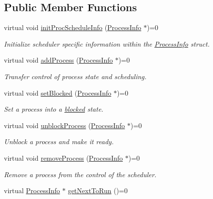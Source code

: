 \subsection*{\-Public \-Member \-Functions}
\begin{DoxyCompactItemize}
\item 
virtual void \hyperlink{classcScheduler_a8782803287dce0352623142643eee01a}{init\-Proc\-Schedule\-Info} (\hyperlink{structProcessInfo}{\-Process\-Info} $\ast$)=0
\begin{DoxyCompactList}\small\item\em \-Initialize scheduler specific information within the \hyperlink{structProcessInfo}{\-Process\-Info} struct. \end{DoxyCompactList}\item 
virtual void \hyperlink{classcScheduler_aeae779c5c160a441e725dfc72656e6dc}{add\-Process} (\hyperlink{structProcessInfo}{\-Process\-Info} $\ast$)=0
\begin{DoxyCompactList}\small\item\em \-Transfer control of process state and scheduling. \end{DoxyCompactList}\item 
virtual void \hyperlink{classcScheduler_ae6119e940a3bf58a00e7dbcea04b5b6a}{set\-Blocked} (\hyperlink{structProcessInfo}{\-Process\-Info} $\ast$)=0
\begin{DoxyCompactList}\small\item\em \-Set a process into a \hyperlink{process_8h_a2c72cb00af5be695c1f898162350821fa035732e2026cb263f1bd9eee6ca6ae01}{blocked} state. \end{DoxyCompactList}\item 
virtual void \hyperlink{classcScheduler_a81fe2e5e5e2334e36db1cbf491e3fa57}{unblock\-Process} (\hyperlink{structProcessInfo}{\-Process\-Info} $\ast$)=0
\begin{DoxyCompactList}\small\item\em \-Unblock a process and make it ready. \end{DoxyCompactList}\item 
virtual void \hyperlink{classcScheduler_a5632ffa597e9567d475c808070c4e3bb}{remove\-Process} (\hyperlink{structProcessInfo}{\-Process\-Info} $\ast$)=0
\begin{DoxyCompactList}\small\item\em \-Remove a process from the control of the scheduler. \end{DoxyCompactList}\item 
virtual \hyperlink{structProcessInfo}{\-Process\-Info} $\ast$ \hyperlink{classcScheduler_a350ad7c55ddcdd17005778b0da241956}{get\-Next\-To\-Run} ()=0

\end{DoxyCompactItemize}
